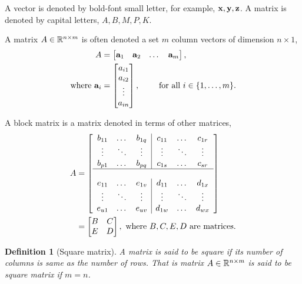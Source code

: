\documentclass{article}
\newtheorem{defn}{Definition}
\begin{document}
A vector is denoted by bold-font small letter, for example, $\mathbf{x}, \mathbf{y}, \mathbf{z}$.
A  matrix is denoted by capital letters, $A, B, M, P, K$.

A matrix $A  \in \mathbb{R}^{n \times  m}$ is often denoted a set $m$ column vectors
of dimension $n   \times  1$,
%
\begin{align}
  A  &=  \begin{bmatrix}
    \mathbf{a}_1 &  \mathbf{a}_2 &  \dots & \mathbf{a}_m
  \end{bmatrix},
 \notag\\
 \text{where   }   \mathbf{a}_i &= \begin{bmatrix}
 a_{i1} \\  a_{i2} \\ \vdots \\ a_{in}
 \end{bmatrix}, \qquad  \text{ for all } i  \in \{1, \dots, m\}.
\end{align}
%

A block matrix  is a matrix denoted in terms  of  other matrices,
%
\begin{align}
  A &= \left[\begin{array}{ccc|ccc}
        b_{11} & \dots  &   b_{1q}  &   c_{11}  &   \dots   & c_{1r} \\
        \vdots  &  \ddots   & \vdots &  \vdots  &  \ddots  &  \vdots  \\
        b_{p1} & \dots  &   b_{pq}  &   c_{1s}  &   \dots   & c_{sr} \\
        \cline{1-6}  \\
        e_{11} & \dots  &   e_{1v}  &   d_{11}  &   \dots   & d_{1x} \\
        \vdots  &  \ddots   & \vdots &  \vdots  &  \ddots  &  \vdots  \\
        e_{u1} & \dots  &   e_{uv}  &   d_{1w}  &   \dots   & d_{wx} \\
            \end{array}\right]
  \\
    &= \begin{bmatrix}
        B  &   C \\
        E & D
        \end{bmatrix}, \text{  where  }  B, C, E, D \text{ are matrices.}
\end{align}
%

\begin{defn}[Square matrix]
  A matrix is said to be square if its number of columns is same as the number
  of rows. That is matrix   $A \in \mathbb{R}^{n \times m}$ is said to be square
  matrix if $m = n$.
\end{defn}
\end{document}
